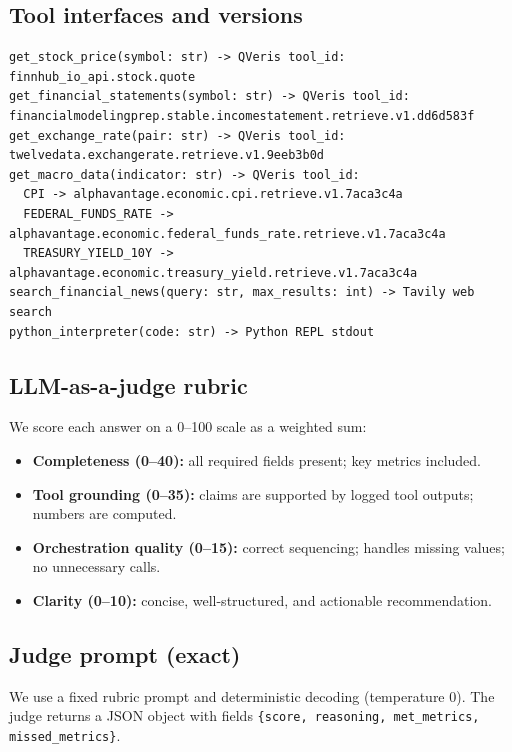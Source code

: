 \documentclass{article}
\begin{document}
\subsection{Tool interfaces and versions}
\begin{lstlisting}
get_stock_price(symbol: str) -> QVeris tool_id: finnhub_io_api.stock.quote
get_financial_statements(symbol: str) -> QVeris tool_id: financialmodelingprep.stable.incomestatement.retrieve.v1.dd6d583f
get_exchange_rate(pair: str) -> QVeris tool_id: twelvedata.exchangerate.retrieve.v1.9eeb3b0d
get_macro_data(indicator: str) -> QVeris tool_id:
  CPI -> alphavantage.economic.cpi.retrieve.v1.7aca3c4a
  FEDERAL_FUNDS_RATE -> alphavantage.economic.federal_funds_rate.retrieve.v1.7aca3c4a
  TREASURY_YIELD_10Y -> alphavantage.economic.treasury_yield.retrieve.v1.7aca3c4a
search_financial_news(query: str, max_results: int) -> Tavily web search
python_interpreter(code: str) -> Python REPL stdout
\end{lstlisting}

\subsection{LLM-as-a-judge rubric}
We score each answer on a 0--100 scale as a weighted sum:
\begin{itemize}
  \item \textbf{Completeness (0--40):} all required fields present; key metrics included.
  \item \textbf{Tool grounding (0--35):} claims are supported by logged tool outputs; numbers are computed.
  \item \textbf{Orchestration quality (0--15):} correct sequencing; handles missing values; no unnecessary calls.
  \item \textbf{Clarity (0--10):} concise, well-structured, and actionable recommendation.
\end{itemize}

\subsection{Judge prompt (exact)}
We use a fixed rubric prompt and deterministic decoding (temperature 0). The judge returns a JSON object with fields \texttt{\{score, reasoning, met\_metrics, missed\_metrics\}}.
\end{document}
